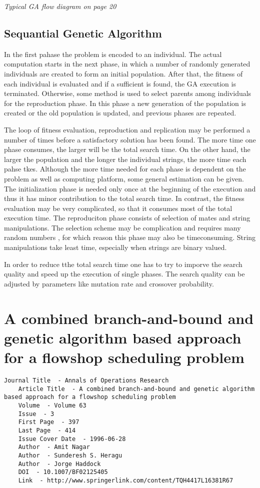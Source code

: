 \documentclass[pdftex,11pt]{article}
\begin{document}
\emph{Typical GA flow diagram on page 20}

\subsection{Sequantial Genetic Algorithm}
In the first pahase the problem is encoded to an individual. The actual computation starts in the next phase, in which a number of randomly generated individuals are created to form an initial population. After that, the fitness of each individual is evaluated and if a sufficient is found, the GA execution is terminated. Otherwise, some method is used to select parents among individuals for the reproduction phase. In this phase a new generation of the population is created or the old population is updated, and previous phases are repeated.

The loop of fitness evaluation, reproduction and replication may be performed a number of times before a satisfactory solution has been found. The more time one phase consumes, the larger will be the total search time. On the other hand, the larger the population and the longer the individual strings, the more time each pahse tkes. Although the more time needed for each phase is dependent on the problem as well as computing platform, some general estimation can be given. The initialization phase is needed only once at the beginning of the execution and thus it has minor contribution to the total search time. In contrast, the fitness evaluation may be very complicated, so that it consumes most of the total execution time. The reproduciton phase consists of selection of mates and string manipulations. The selection scheme may be complication and requires many random numbers , for which reason this phase may also be timeconsuming. String manipulations take least time, especially when strings are binary valued.

In order to reduce tthe total search time one has to try to imporve the search quality and speed up the execution of single phases. The search quality can be adjusted by parameters like mutation rate and crossover probability.

\section{A combined branch-and-bound and genetic algorithm based approach for a flowshop scheduling problem}
\begin{verbatim}
Journal Title  - Annals of Operations Research
    Article Title  - A combined branch-and-bound and genetic algorithm based approach for a flowshop scheduling problem
    Volume  - Volume 63
    Issue  - 3
    First Page  - 397
    Last Page  - 414
    Issue Cover Date  - 1996-06-28
    Author  - Amit Nagar
    Author  - Sunderesh S. Heragu
    Author  - Jorge Haddock
    DOI  - 10.1007/BF02125405
    Link  - http://www.springerlink.com/content/TQH4417L16381R67
\end{verbatim}
\end{document}
